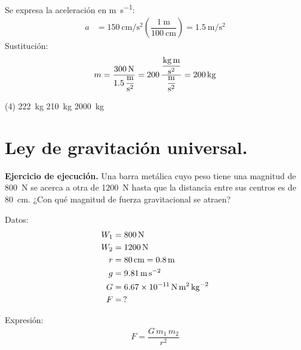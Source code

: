 \documentclass[12pt, letter]{exam}
\begin{document}
\begin{questions}
    Se expresa la aceleración en \unit{\meter\per\second}:
    \begin{align*}
        a &= \SI[per-mode=fraction]{150}{\centi\meter\per\square\second} \left( \dfrac{\SI{1}{\meter}}{\SI{100}{\centi\meter}} \right) = \SI[per-mode=fraction]{1.5}{\meter\per\square\second}
    \end{align*}
    Sustitución:
    \begin{align*}
    m = \dfrac{\SI{300}{\newton}}{\displaystyle \SI[per-mode=fraction]{1.5}{\meter\per\square\second}} = \num{200} \, \dfrac{\displaystyle \unit[per-mode=fraction]{\kilo\gram\meter\per\square\second}}{\displaystyle \unit[per-mode=fraction]{\meter\per\square\second}} = \SI{200}{\kilo\gram}
    \end{align*}
        
    \begin{tasks}(4)
        \task \SI{222}{\kilo\gram}
        \task {}
        \task \SI{210}{\kilo\gram}
        \task \SI{2000}{\kilo\gram}
    \end{tasks}

    \section{Ley de gravitación universal.}

    \setcounter{question}{17} \question \label{Ejercicio_11} \textbf{Ejercicio de ejecución. } Una barra metálica cuyo peso tiene una magnitud de \SI{800}{\newton} se acerca a otra de \SI{1200}{\newton} hasta que la distancia entre sus centros es de \SI{80}{\centi\meter}. ¿Con qué magnitud de fuerza gravitacional se atraen?

    \begin{minipage}[t]{0.35\linewidth}
    Datos: 
    \begin{align*}
    W_{1} &= \SI{800}{\newton} \\
    W_{2} &= \SI{1200}{\newton} \\
    r &= \SI{80}{\centi\meter} = \SI{0.8}{\meter} \\
    g &= \SI{9.81}{\meter\per\square\second} \\
    G &= \SI{6.67d-11}{\newton\square\meter\per\square\kilo\gram} \\
    F &= \, ?
    \end{align*}
    \end{minipage}
    \hspace{1cm}
    \begin{minipage}[t]{0.4\linewidth}
    Expresión:
    \begin{align*}
    F = \dfrac{G \, m_{1} \, m_{2}}{r^{2}}
    \end{align*}
    \end{minipage}


\end{questions}
\end{document}

